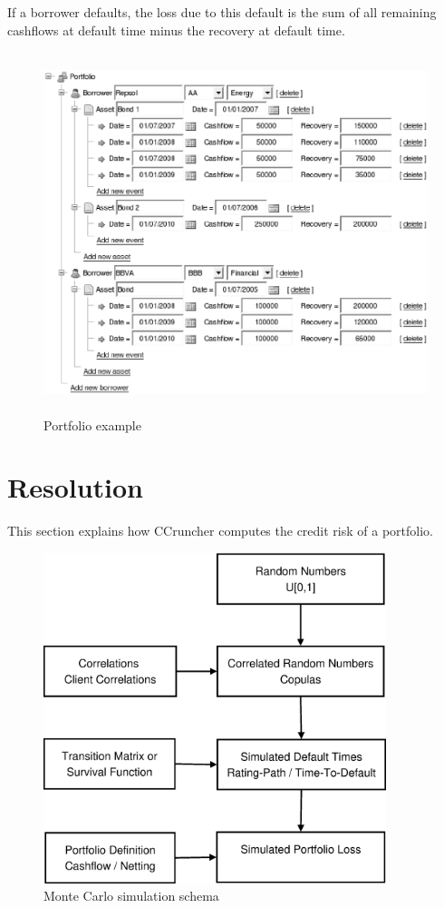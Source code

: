 \documentclass[a4paper,12pt,final]{article}
\begin{document}
If a borrower defaults, the loss due to this default is the sum of all remaining
cashflows at default time minus the recovery at default time.

\begin{figure}[!hbt]
\begin{center}
\includegraphics[height=10.5cm, angle=0]{./images/portfolio.eps}
\caption{Portfolio example}
\label{portfolio}
\end{center}
\end{figure}
\FloatBarrier

\clearpage
\section{Resolution}

This section explains how CCruncher computes the credit risk of a portfolio.

\begin{figure}[!hb]
\begin{center}
\includegraphics[width=10cm,angle=0]{./images/esquema1.eps}
\caption{Monte Carlo simulation schema}
\label{fig:mcschema1}
\end{center}
\end{figure}
\end{document}
